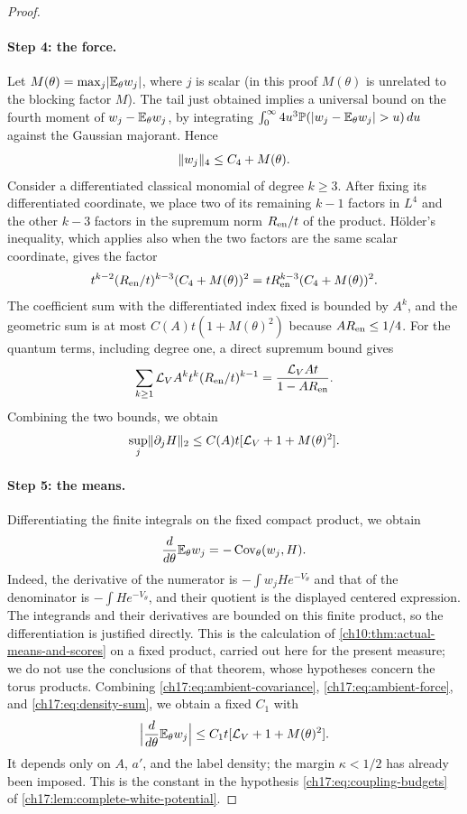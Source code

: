 \begin{proof}
\paragraph{Step 4: the force.}
Let $M(\theta)=\max_j\lvert \mathbb E_\theta w_j\rvert$, where $j$ is scalar (in this proof $M(\theta)$ is unrelated to the blocking factor $M$). The tail just obtained implies a universal bound on the fourth moment of $w_j-\mathbb E_\theta w_j$, by integrating $\int_0^\infty4u^3\mathbb P(\lvert w_j-\mathbb E_\theta w_j\rvert>u)\,du$ against the Gaussian majorant. Hence
\[
 \lVert w_j\rVert_4\le C_4+M(\theta).
\]
Consider a differentiated classical monomial of degree $k\ge3$. After fixing its differentiated coordinate, we place two of its remaining $k-1$ factors in $L^4$ and the other $k-3$ factors in the supremum norm $R_{\mathrm{en}}/t$ of the product. H\"older's inequality, which applies also when the two factors are the same scalar coordinate, gives the factor
\[
 t^{k-2}(R_{\mathrm{en}}/t)^{k-3}(C_4+M(\theta))^2=tR_{\mathrm{en}}^{k-3}(C_4+M(\theta))^2.
\]
The coefficient sum with the differentiated index fixed is bounded by $A^k$, and the geometric sum is at most $C(A)t(1+M(\theta)^2)$ because $AR_{\mathrm{en}}\le1/4$. For the quantum terms, including degree one, a direct supremum bound gives
\[
 \sum_{k\ge1}\mathcal L_VA^kt^k(R_{\mathrm{en}}/t)^{k-1}=\frac{\mathcal L_VAt}{1-AR_{\mathrm{en}}}.
\]
Combining the two bounds, we obtain
\begin{equation}\label{ch17:eq:ambient-force}
 \sup_j\lVert \partial_jH\rVert_2\le C(A)t[\mathcal L_V+1+M(\theta)^2].
\end{equation}

\paragraph{Step 5: the means.}
Differentiating the finite integrals on the fixed compact product, we obtain
\[
 \frac{d}{d\theta}\mathbb E_\theta w_j=-\operatorname{Cov}_\theta(w_j,H).
\]
Indeed, the derivative of the numerator is $-\int w_jHe^{-V_\theta}$ and that of the denominator is $-\int He^{-V_\theta}$, and their quotient is the displayed centered expression. The integrands and their derivatives are bounded on this finite product, so the differentiation is justified directly. This is the calculation of \cref{ch10:thm:actual-means-and-scores} on a fixed product, carried out here for the present measure; we do not use the conclusions of that theorem, whose hypotheses concern the torus products. Combining \eqref{ch17:eq:ambient-covariance}, \eqref{ch17:eq:ambient-force}, and \eqref{ch17:eq:density-sum}, we obtain a fixed $C_1$ with
\begin{equation}\label{ch17:eq:mean-interpolation}
 \Bigl\lvert\frac{d}{d\theta}\mathbb E_\theta w_j\Bigr\rvert\le C_1t[\mathcal L_V+1+M(\theta)^2].
\end{equation}
It depends only on $A$, $a'$, and the label density; the margin $\kappa<1/2$ has already been imposed. This is the constant in the hypothesis \eqref{ch17:eq:coupling-budgets} of \cref{ch17:lem:complete-white-potential}.


\end{proof}
